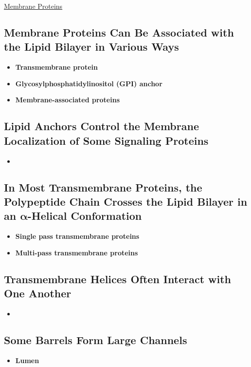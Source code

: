 \documentclass[12pt,letterpaper]{article}
\begin{document}
\begin{secbox}{\hyperlink{10}{Membrane Proteins}}{
    \subsection*{Membrane Proteins Can Be Associated with the Lipid Bilayer in Various Ways}
    \begin{itemize}
        \item \textbf{Transmembrane protein}
        \item \textbf{Glycosylphosphatidylinositol (GPI) anchor}
        \item \textbf{Membrane-associated proteins}
    \end{itemize}
    
    \subsection*{Lipid Anchors Control the Membrane Localization of Some Signaling Proteins}
    \begin{itemize}
        \item
    \end{itemize}
    
    \subsection*{In Most Transmembrane Proteins, the Polypeptide Chain Crosses the Lipid Bilayer in an \(\bm{\alpha}\)-Helical Conformation}
    \begin{itemize}
        \item \textbf{Single pass transmembrane proteins}
        \item \textbf{Multi-pass transmembrane proteins}
    \end{itemize}
    
    \subsection*{Transmembrane \bfg{\alpha} Helices Often Interact with One Another}
    \begin{itemize}
        \item 
    \end{itemize}

    \subsection*{Some \bfg{\beta} Barrels Form Large Channels}
    \begin{itemize}
        \item \textbf{Lumen}
    \end{itemize}

}
\end{secbox}
\end{document}
